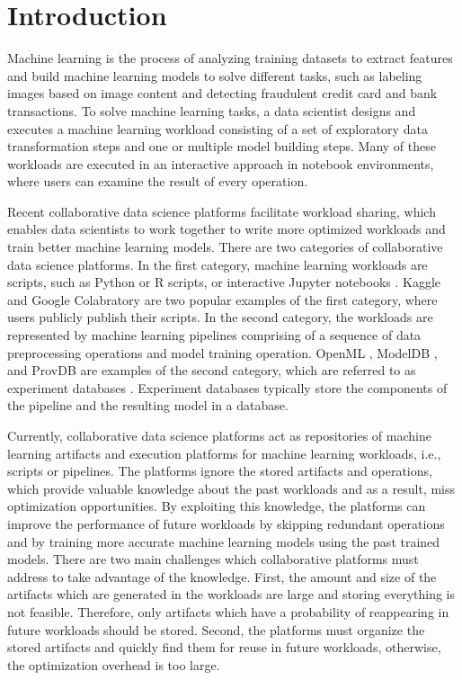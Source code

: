 \section{Introduction} \label{sec-introduction}
Machine learning is the process of analyzing training datasets to extract features and build machine learning models to solve different tasks, such as labeling images based on image content and detecting fraudulent credit card and bank transactions.
To solve machine learning tasks, a data scientist designs and executes a machine learning workload consisting of a set of exploratory data transformation steps and one or multiple model building steps.
Many of these workloads are executed in an interactive approach in notebook environments, where users can examine the result of every operation.

Recent collaborative data science platforms facilitate workload sharing, which enables data scientists to work together to write more optimized workloads and train better machine learning models.
There are two categories of collaborative data science platforms.
In the first category, machine learning workloads are scripts, such as Python or R scripts, or interactive Jupyter notebooks \cite{Kluyver:2016aa}.
Kaggle \cite{kagglewebsite} and Google Colabratory \cite{googlecolab} are two popular examples of the first category, where users publicly publish their scripts.
In the second category, the workloads are represented by machine learning pipelines comprising of a sequence of data preprocessing operations and model training operation.
OpenML \cite{vanschoren2014openml}, ModelDB \cite{vartak2016m}, and ProvDB \cite{miao2018provdb} are examples of the second category, which are referred to as experiment databases \cite{Vanschoren2012}.
Experiment databases typically store the components of the pipeline and the resulting model in a database.

Currently, collaborative data science platforms act as repositories of machine learning artifacts and execution platforms for machine learning workloads, i.e., scripts or pipelines.
The platforms ignore the stored artifacts and operations, which provide valuable knowledge about the past workloads and as a result, miss optimization opportunities.
By exploiting this knowledge, the platforms can improve the performance of future workloads by skipping redundant operations and by training more accurate machine learning models using the past trained models.
There are two main challenges which collaborative platforms must address to take advantage of the knowledge.
First, the amount and size of the artifacts which are generated in the workloads are large and storing everything is not feasible.
Therefore, only artifacts which have a probability of reappearing in future workloads should be stored.
Second, the platforms must organize the stored artifacts and quickly find them for reuse in future workloads, otherwise, the optimization overhead is too large.

